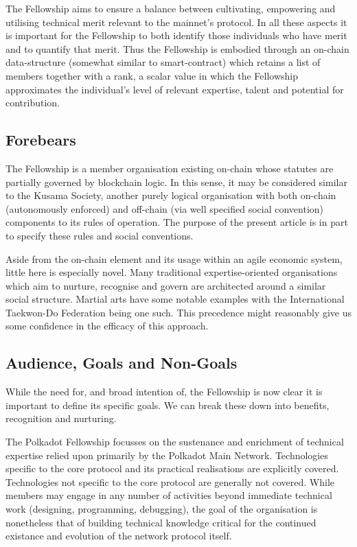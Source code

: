 \documentclass[9pt,oneside]{amsart}
\begin{document}
The Fellowship aims to ensure a balance between cultivating, empowering and utilising technical merit relevant to the mainnet's protocol. In all these aspects it is important for the Fellowship to both identify those individuals who have merit and to quantify that merit. Thus the Fellowship is embodied through an on-chain data-structure (somewhat similar to smart-contract) which retains a list of members together with a rank, a scalar value in which the Fellowship approximates the individual's level of relevant expertise, talent and potential for contribution.

\subsection{Forebears}

The Fellowship is a member organisation existing on-chain whose statutes are partially governed by blockchain logic. In this sense, it may be considered similar to the Kusama Society, another purely logical organisation with both on-chain (autonomously enforced) and off-chain (via well specified social convention) components to its rules of operation. The purpose of the present article is in part to specify these rules and social conventions.

Aside from the on-chain element and its usage within an agile economic system, little here is especially novel. Many traditional expertise-oriented organisations which aim to nurture, recognise and govern are architected around a similar social structure. Martial arts have some notable examples with the International Taekwon-Do Federation being one such. This precedence might reasonably give us some confidence in the efficacy of this approach.

\subsection{Audience, Goals and Non-Goals}\label{goals}

While the need for, and broad intention of, the Fellowship is now clear it is important to define its specific goals. We can break these down into benefits, recognition and nurturing.

The Polkadot Fellowship focusses on the sustenance and enrichment of technical expertise relied upon primarily by the Polkadot Main Network. Technologies specific to the core protocol and its practical realisations are explicitly covered. Technologies not specific to the core protocol are generally not covered. While members may engage in any number of activities beyond immediate technical work (designing, programming, debugging), the goal of the organisation is nonetheless that of building technical knowledge critical for the continued existance and evolution of the network protocol itself.
\end{document}
